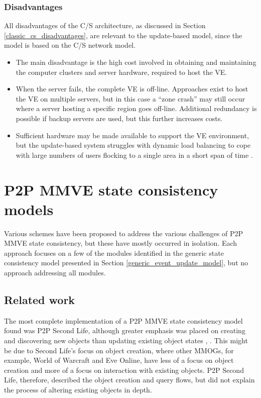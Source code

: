 \subsubsection{Disadvantages}


All disadvantages of the C/S architecture, as discussed in Section \ref{classic_cs_disadvantages}, are relevant to the update-based model, since the model is based on the C/S network model.
%
\begin{itemize}
\item The main disadvantage is the high cost involved in obtaining and maintaining the computer clusters and server hardware, required to host the VE.

\item When the server fails, the complete VE is off-line. Approaches exist to host the VE on multiple servers, but in this case a ``zone crash'' may still occur where a server hosting a specific region goes off-line. Additional redundancy is possible if backup servers are used, but this further increases costs.

\item Sufficient hardware may be made available to support the VE environment, but the update-based system struggles with dynamic load balancing to cope with large numbers of users flocking to a single area in a short span of time \cite{flocking}.
\end{itemize}

\section{P2P MMVE state consistency models}
\label{p2p_mmve_state_consistency}

Various schemes have been proposed to address the various challenges of P2P MMVE state consistency, but these have mostly occurred in isolation. Each approach focuses on a few of the modules identified in the generic state consistency model presented in Section \ref{generic_event_update_model}, but no approach addressing all modules.

\subsection{Related work}
The most complete implementation of a P2P MMVE state consistency model found was P2P Second Life, although greater emphasis was placed on creating and discovering new objects than updating existing object states \cite{varvello_p2p_second_life}, \cite{Walkad_Varvello}. This might be due to Second Life's focus on object creation, where other MMOGs, for example, World of Warcraft and Eve Online, have less of a focus on object creation and more of a focus on interaction with existing objects. P2P Second Life, therefore, described the object creation and query flows, but did not explain the process of altering existing objects in depth.

